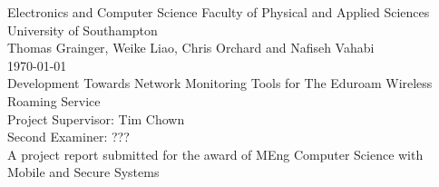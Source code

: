\begin{titlepage}

\begin{center}

{\large Electronics and Computer Science
Faculty of Physical and Applied Sciences
University of Southampton}\\[10em]

{\large Thomas Grainger, Weike Liao, Chris Orchard and Nafiseh Vahabi}\\[5em]

{\large \today}\\[5em]

{\LARGE Development Towards Network Monitoring Tools for The Eduroam 
Wireless Roaming Service}\\[10em]

{\large Project Supervisor: Tim Chown\\
Second Examiner: ???}\\[5em]

{\large A project report submitted for the award of MEng Computer Science with
Mobile and Secure Systems}

\end{center}

\end{titlepage}
